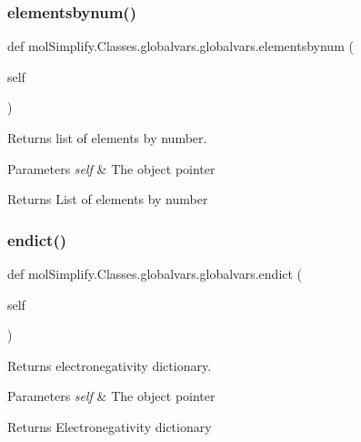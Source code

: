 \subsubsection{\texorpdfstring{elementsbynum()}{elementsbynum()}}
{\footnotesize\ttfamily def mol\+Simplify.\+Classes.\+globalvars.\+globalvars.\+elementsbynum (\begin{DoxyParamCaption}\item[{}]{self }\end{DoxyParamCaption})}



Returns list of elements by number. 


\begin{DoxyParams}{Parameters}
{\em self} & The object pointer \\
\hline
\end{DoxyParams}
\begin{DoxyReturn}{Returns}
List of elements by number 
\end{DoxyReturn}
\mbox{\label{classmolSimplify_1_1Classes_1_1globalvars_1_1globalvars_a624f761230e8d21715ab233d96991398}} 
\subsubsection{\texorpdfstring{endict()}{endict()}}
{\footnotesize\ttfamily def mol\+Simplify.\+Classes.\+globalvars.\+globalvars.\+endict (\begin{DoxyParamCaption}\item[{}]{self }\end{DoxyParamCaption})}



Returns electronegativity dictionary. 


\begin{DoxyParams}{Parameters}
{\em self} & The object pointer \\
\hline
\end{DoxyParams}
\begin{DoxyReturn}{Returns}
Electronegativity dictionary 
\end{DoxyReturn}
\mbox{\label{classmolSimplify_1_1Classes_1_1globalvars_1_1globalvars_a673cd53d924bdfef605d520b8c2ab3a8}} 
